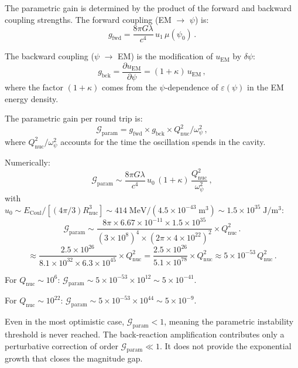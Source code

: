 \documentclass[aps,prd,twocolumn,superscriptaddress,nofootinbib]{revtex4-2}
\newcommand{\ee}[1]{\times 10^{#1}}
\newcommand{\mufunction}{\mu}
\newcommand{\kap}{\kappa}
\newcommand{\lam}{\lambda}
\newcommand{\Qnuc}{Q_{\mathrm{nuc}}}
\newcommand{\wpsi}{\omega_\psi}
\newcommand{\Rnuc}{R_{\mathrm{nuc}}}
\newcommand{\Ecoul}{E_{\mathrm{Coul}}}
\begin{document}
The parametric gain is determined by the product of the forward and
backward coupling strengths.  The forward coupling (EM $\to$ $\psi$)
is:
\begin{equation}
g_{\mathrm{fwd}} = \frac{8\pi G\lam}{c^4}\,u_1\,\mufunction(\psi_0)\,.
\end{equation}

The backward coupling ($\psi$ $\to$ EM) is the modification of
$u_{\mathrm{EM}}$ by $\delta\psi$:
\begin{equation}
g_{\mathrm{bck}} = \frac{\partial u_{\mathrm{EM}}}{\partial\psi}
= (1 + \kap)\,u_{\mathrm{EM}}\,,
\end{equation}
where the factor $(1 + \kap)$ comes from the $\psi$-dependence of
$\varepsilon(\psi)$ in the EM energy density.

The parametric gain per round trip is:
\begin{equation}\label{eq:parametric-gain}
\mathcal{G}_{\mathrm{param}} = g_{\mathrm{fwd}} \times g_{\mathrm{bck}}
\times \Qnuc^2 / \wpsi^2\,,
\end{equation}
where $\Qnuc^2/\wpsi^2$ accounts for the time the oscillation
spends in the cavity.

Numerically:
\begin{equation}
\mathcal{G}_{\mathrm{param}} \sim
\frac{8\pi G\lam}{c^4}\,u_0\,(1+\kap)\,
\frac{\Qnuc^2}{\wpsi^2}\,,
\end{equation}
with $u_0 \sim \Ecoul/[(4\pi/3)\Rnuc^3] \sim 414\;\mathrm{MeV}/
(4.5\ee{-43}\;\mathrm{m^3}) \sim 1.5\ee{35}\;\mathrm{J/m^3}$:
\begin{equation}
\mathcal{G}_{\mathrm{param}} \sim \frac{8\pi \times 6.67\ee{-11}
\times 1.5\ee{35}}{(3\ee{8})^4 \times (2\pi \times 4\ee{22})^2}
\times \Qnuc^2\,.
\end{equation}
\begin{equation}
\approx \frac{2.5\ee{26}}{8.1\ee{32} \times 6.3\ee{45}} \times \Qnuc^2
= \frac{2.5\ee{26}}{5.1\ee{78}} \times \Qnuc^2
\approx 5\ee{-53}\,\Qnuc^2\,.
\end{equation}

For $\Qnuc \sim 10^6$: $\mathcal{G}_{\mathrm{param}} \sim
5\ee{-53} \times 10^{12} \sim 5\ee{-41}$.

For $\Qnuc \sim 10^{22}$: $\mathcal{G}_{\mathrm{param}} \sim
5\ee{-53} \times 10^{44} \sim 5\ee{-9}$.

Even in the most optimistic case, $\mathcal{G}_{\mathrm{param}} < 1$,
meaning the parametric instability threshold is never reached.  The
back-reaction amplification contributes only a perturbative correction
of order $\mathcal{G}_{\mathrm{param}} \ll 1$.  It does not provide
the exponential growth that closes the magnitude gap.
\end{document}

